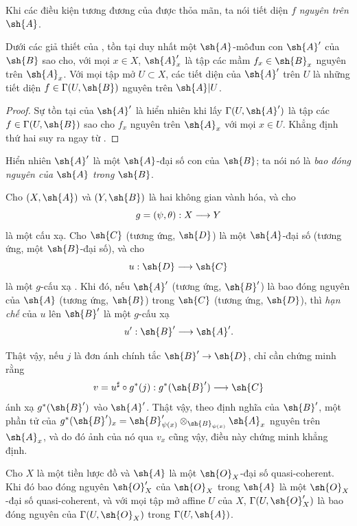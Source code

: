 \documentclass[oneside,10pt]{amsart}
\makeatletter
\newcommand{\ega@arrow}[2]{\mathchoice{#1}{#2}{#2}{#2}}
\renewcommand{\to}{\ega@arrow{\longrightarrow}{\rightarrow}}
\let\EGAOriginalLabel\label
\renewcommand{\label}[1]{\phantomsection\EGAOriginalLabel{#1}}
\makeatother
\begin{document}
Khi các điều kiện tương đương của  được thỏa mãn, ta nói tiết diện $f$ \emph{nguyên trên $\sh{A}$}.

\begin{corollary}[6.3.2]
\label{II.6.3.2}
Dưới các giả thiết của , tồn tại duy nhất một $\sh{A}$-môđun con $\sh{A}'$ của $\sh{B}$ sao cho, với mọi $x\in X$, $\sh{A}'_x$ là tập các mầm $f_x\in\sh{B}_x$ nguyên trên $\sh{A}_x$.
Với mọi tập mở $U\subset X$, các tiết diện của $\sh{A}'$ trên $U$ là những tiết diện $f\in\Gamma(U,\sh{B})$ nguyên trên $\sh{A}|U$.
\end{corollary}

\begin{proof}
Sự tồn tại của $\sh{A}'$ là hiển nhiên khi lấy $\Gamma(U,\sh{A}')$ là tập các $f\in\Gamma(U,\sh{B})$ sao cho $f_x$ nguyên trên $\sh{A}_x$ với mọi $x\in U$.
Khẳng định thứ hai suy ra ngay từ .
\end{proof}

Hiển nhiên $\sh{A}'$ là một $\sh{A}$-đại số con của $\sh{B}$;
ta nói nó là \emph{bao đóng nguyên của $\sh{A}$ trong $\sh{B}$}.

\begin{env}[6.3.3]
\label{II.6.3.3}
Cho $(X,\sh{A})$ và $(Y,\sh{B})$ là hai không gian vành hóa, và cho
\[
  g=(\psi,\theta):X\to Y
\]
là một cấu xạ.
Cho $\sh{C}$ (tương ứng, $\sh{D}$) là một $\sh{A}$-đại số (tương ứng, một $\sh{B}$-đại số), và cho
\[
  u:\sh{D}\to\sh{C}
\]
là một $g$-cấu xạ .
Khi đó, nếu $\sh{A}'$ (tương ứng, $\sh{B}'$) là bao đóng nguyên của $\sh{A}$ (tương ứng, $\sh{B}$) trong $\sh{C}$ (tương ứng, $\sh{D}$), thì \emph{hạn chế} của $u$ lên $\sh{B}'$ là một $g$-cấu xạ
\[
  u':\sh{B}'\to\sh{A}'.
\]

Thật vậy, nếu $j$ là đơn ánh chính tắc $\sh{B}'\to\sh{D}$, chỉ cần chứng minh rằng
\[
  v=u^\sharp\circ g^*(j):g^*(\sh{B}')\to\sh{C}
\]
ánh xạ $g^*(\sh{B}')$ vào $\sh{A}'$.
Thật vậy, theo định nghĩa của $\sh{B}'$, một phần tử của $g^*(\sh{B}')_x=\sh{B}'_{\psi(x)}\otimes_{\sh{B}_{\psi(x)}}\sh{A}_x$ nguyên trên $\sh{A}_x$, và do đó ảnh của nó qua $v_x$ cũng vậy, điều này chứng minh khẳng định.
\end{env}

\begin{proposition}[6.3.4]
\label{II.6.3.4}
Cho $X$ là một tiền lược đồ và $\sh{A}$ là một $\sh{O}_X$-đại số quasi-coherent.
Khi đó bao đóng nguyên $\sh{O}'_X$ của $\sh{O}_X$ trong $\sh{A}$ là một $\sh{O}_X$-đại số quasi-coherent, và với mọi tập mở affine $U$ của $X$, $\Gamma(U,\sh{O}'_X)$ là bao đóng nguyên của $\Gamma(U,\sh{O}_X)$ trong $\Gamma(U,\sh{A})$.
\end{proposition}
\end{document}
